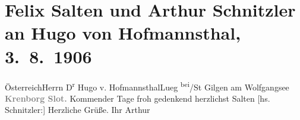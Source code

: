 

         
         \renewcommand{\erwaehntePersonen}{Personen: Hugo von Hofmannsthal, Felix Salten}
         \renewcommand{\erwaehnteOrte}{Orte: Helsingør, Lueg am Wolfgangsee, Schloss Kronborg, St. Gilgen, Österreich}
         \renewcommand{\erwaehnteWerke}{}
               \section[Felix Salten und Arthur Schnitzler an Hugo von Hofmannsthal, 3. 8. 1906]{ Felix Salten und Arthur Schnitzler an Hugo von Hofmannsthal,
               3. 8. 1906}\nopagebreak{}\rehead{ }\begin{ledgroupsized}[t]{13cm}\normalsize\beginnumbering \toendnotes[C]{\smallbreak\pagebreak[2]} 
\pstart{}{\pb}Österreich\pend{}\pstart{}Herrn D\textsuperscript{r} Hugo v. Hofmannsthal\pend{}\pstart{}Lueg \textsuperscript{bei}/St Gilgen am
                     Wolfgangsee\pend{}{\bigskip}\pstart
           \noindent{}\centering{}{\pb}\textcolor{gray}{\textbf{Krenborg Slot.}}\pend
           \pstart
           {\pb}Kommender Tage froh gedenkend herzlichst
                  \spacefill\mbox{Salten}\pend
           \pstart
           {[}hs. Schnitzler:{]} Herzliche Grüße. Ihr \spacefill\mbox{Arthur}\pend
           
         
         \endnumbering{}\end{ledgroupsized}  \newcommand{\dateiname}{L01620}\newcommand{\titel}{Felix Salten und Arthur Schnitzler an Hugo von Hofmannsthal, 3. 8. 1906}\newcommand{\editorInnen}{Martin Anton Müller und Gerd-Hermann Susen}
      